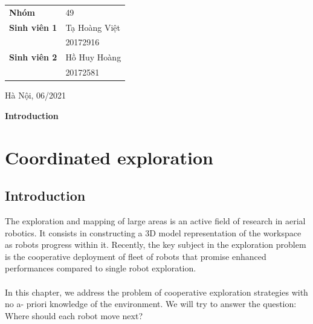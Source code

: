 \documentclass[11pt,openany]{book}
\begin{document}
\begin{titlepage}
\begin{center}
        \vspace{1cm}
        \Large
        \begin{center}
            \begin{tabular}{ l l }
                \textbf{Nhóm}        & 49            \\
                \textbf{Sinh viên 1} & Tạ Hoàng Việt \\
                                     & 20172916      \\
                \textbf{Sinh viên 2} & Hồ Huy Hoàng  \\
                                     & 20172581
            \end{tabular}
        \end{center}
        \vspace{1cm}
        \normalsize
        Hà Nội, 06/2021
    \end{center}
\end{titlepage}
\tableofcontents
\listoffigures
\listoftables
\newpage
\thispagestyle{plain}
\begin{center}
    \Huge
    \textbf{Introduction}
\end{center}
\chapter{Coordinated exploration}
\section{Introduction}
The exploration and mapping of large areas is an active field of research in aerial robotics. It consists in constructing a 3D model representation of the workspace as robots progress within it. Recently, the key subject in the exploration problem is the cooperative deployment of ﬂeet of robots that promise enhanced performances compared to single robot exploration.\\\\
In this chapter, we address the problem of cooperative exploration strategies with no a- priori knowledge of the environment. We will try to answer the question: Where should each robot move next?
\end{document}
